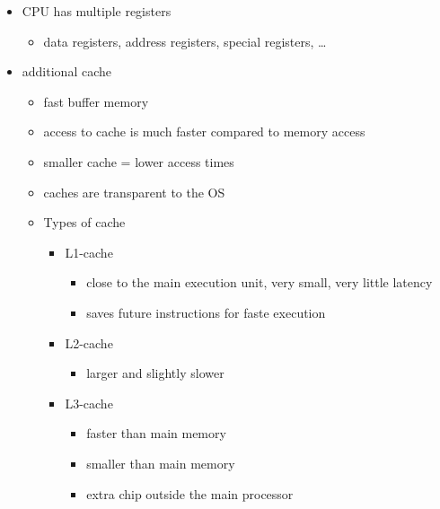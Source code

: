 \documentclass[
]{article}
\providecommand{\tightlist}{%
  \setlength{\itemsep}{0pt}\setlength{\parskip}{0pt}}
\begin{document}
\begin{itemize}
\tightlist
\item
  CPU has multiple registers

  \begin{itemize}
  \tightlist
  \item
    data registers, address registers, special registers, \ldots{}
  \end{itemize}
\item
  additional cache

  \begin{itemize}
  \tightlist
  \item
    fast buffer memory
  \item
    access to cache is much faster compared to memory access
  \item
    smaller cache = lower access times
  \item
    caches are transparent to the OS
  \item
    Types of cache

    \begin{itemize}
    \tightlist
    \item
      L1-cache

      \begin{itemize}
      \tightlist
      \item
        close to the main execution unit, very small, very little
        latency
      \item
        saves future instructions for faste execution
      \end{itemize}
    \item
      L2-cache

      \begin{itemize}
      \tightlist
      \item
        larger and slightly slower
      \end{itemize}
    \item
      L3-cache

      \begin{itemize}
      \tightlist
      \item
        faster than main memory
      \item
        smaller than main memory
      \item
        extra chip outside the main processor
      \end{itemize}
    \end{itemize}


\end{itemize}
\end{itemize}
\end{document}
